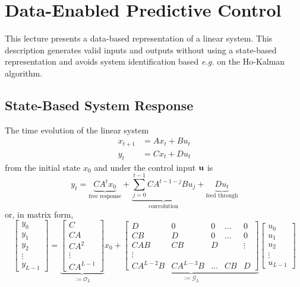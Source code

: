 \chapter{Data-Enabled Predictive Control}
\label{chap:deepc}

This lecture presents a data-based representation of a linear system. This description generates valid inputs and outputs without using a state-based representation and avoids system identification based \textit{e.g.} on the Ho-Kalman algorithm.

\section{State-Based System Response}
\label{sec:deepc-state-based-response}

The time evolution of the linear system
\begin{equation*}
  \begin{aligned}
    x_{t+1} &= Ax_t + Bu_t \\
    y_t &= Cx_t + Du_t
  \end{aligned}
\end{equation*}
from the initial state $x_0$ and under the control input $\boldsymbol{\mathrm{u}}$ is
\begin{equation}
  \label{eq:time-evolution-free-response-convolution}
  y_t = \underbrace{CA^tx_0}_{\text{free response}} + \underbrace{\sum_{j=0}^{t-1}CA^{t-1-j}Bu_j}_{\text{convolution}} + \underbrace{Du_t}_{\text{feed through}}
\end{equation}
or, in matrix form,
\begin{equation}
  \label{eq:time-evolution-free-response-convolution-matrix}
  \begin{bmatrix}
    y_0 \\ y_1 \\ y_2 \\ \vdots \\ y_{L-1}
  \end{bmatrix} = \underbrace{
    \begin{bmatrix}
      C \\ CA \\ CA^2 \\ \vdots \\ CA^{L-1}
    \end{bmatrix}
  }_{:=\mathcal{O}_L} x_0 + \underbrace{
  \begin{bmatrix}
    D & 0 & 0 & \ldots & 0 \\
    CB & D & 0 & \ldots & 0 \\
    CAB & CB & D & & \vdots \\
    \vdots \\
    CA^{L-2}B & CA^{L-3}B & \ldots & CB & D
  \end{bmatrix}}_{:=\mathcal{G}_L}
\begin{bmatrix}
  u_0 \\ u_1 \\ u_2 \\ \vdots \\ u_{L-1}
  \end{bmatrix}
\end{equation}
